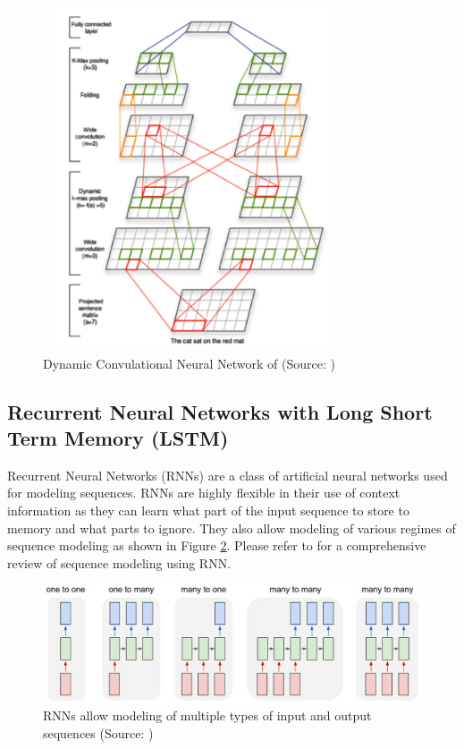 \documentclass{article} %
\begin{document}
\begin{figure}
	\centering
	\includegraphics[height=4in, width=0.8\textwidth]{figs/DCNN.png}
	\caption{Dynamic Convulational Neural Network of \cite{kalchbrenner2014convolutional} (Source: \cite{kalchbrenner2014convolutional})}
	\label{fig:dcnn}
\end{figure}

\subsection{Recurrent Neural Networks with Long Short Term Memory (LSTM)}
Recurrent Neural Networks (RNNs) are a class of artificial neural networks used for modeling sequences.
RNNs are highly flexible in their use of context information as they can learn what part of the input sequence to store to memory and what parts to ignore. They also allow modeling of various regimes of sequence modeling as shown in Figure \ref{fig:rnn}. Please refer to \cite{graves2012supervised} for a comprehensive review of sequence modeling using RNN.

\begin{figure}
	\centering
	\includegraphics[width=\textwidth]{figs/rnn.jpeg}
	\caption{RNNs allow modeling of multiple types of input and output sequences (Source: \cite{karpathy-rnn})}
	\label{fig:rnn}
\end{figure}
\end{document}
